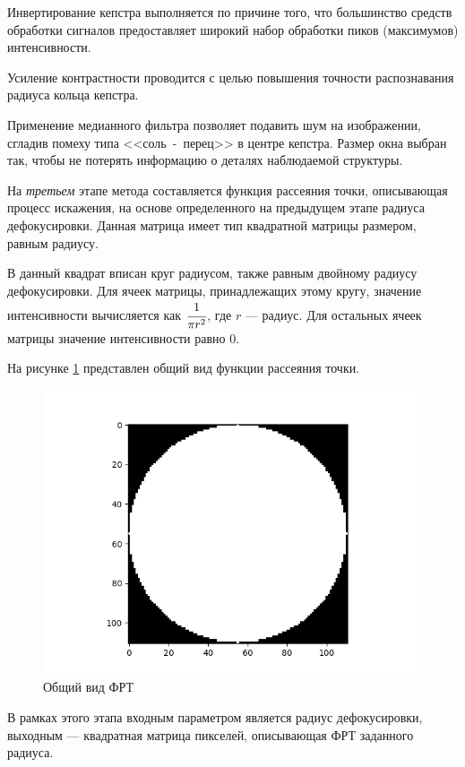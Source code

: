 Инвертирование кепстра выполняется по причине того, что большинство средств обработки сигналов предоставляет широкий набор обработки пиков (максимумов) интенсивности. 

Усиление контрастности проводится с целью повышения точности распознавания радиуса кольца кепстра. 

Применение медианного фильтра позволяет подавить шум на изображении, сгладив помеху типа <<соль~-~перец>> в центре кепстра. Размер окна выбран так, чтобы не потерять информацию о деталях наблюдаемой структуры.

На \textit{третьем} этапе метода составляется функция рассеяния точки, описывающая процесс искажения, на основе определенного на предыдущем этапе радиуса дефокусировки. Данная матрица имеет тип квадратной матрицы размером, равным радиусу. 

В данный квадрат вписан круг радиусом, также равным двойному радиусу дефокусировки. Для ячеек матрицы, принадлежащих этому кругу, значение интенсивности вычисляется как $\cfrac{1}{\pi r^2}$, где $r$ --- радиус. Для остальных ячеек матрицы значение интенсивности равно 0.

На рисунке \ref{disk} представлен общий вид функции рассеяния точки.

\begin{figure}[H]
	\centering
	\includegraphics[scale=0.7]{assets/disk.png}
	\caption{Общий вид ФРТ}
	\label{disk}
\end{figure}

В рамках этого этапа входным параметром является радиус дефокусировки, выходным --- квадратная матрица пикселей, описывающая ФРТ заданного радиуса.

